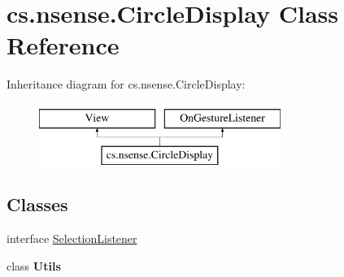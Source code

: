 \hypertarget{classcs_1_1nsense_1_1_circle_display}{\section{cs.\-nsense.\-Circle\-Display Class Reference}
\label{classcs_1_1nsense_1_1_circle_display}
}
Inheritance diagram for cs.\-nsense.\-Circle\-Display\-:\begin{figure}[H]
\begin{center}
\leavevmode
\includegraphics[height=2.000000cm]{classcs_1_1nsense_1_1_circle_display}
\end{center}
\end{figure}
\subsection*{Classes}
\begin{DoxyCompactItemize}
\item 
interface \hyperlink{interfacecs_1_1nsense_1_1_circle_display_1_1_selection_listener}{Selection\-Listener}
\item 
class {\bfseries Utils}
\end{DoxyCompactItemize}

